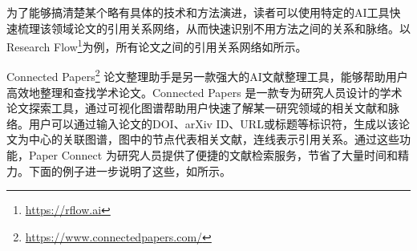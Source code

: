 


为了能够搞清楚某个略有具体的技术和方法演进，读者可以使用特定的AI工具快速梳理该领域论文的引用关系网络，从而快速识别不用方法之间的关系和脉络。以Research Flow\footnote{\url{https://rflow.ai}}为例，所有论文之间的引用关系网络如所示。



Connected Papers\footnote{\url{https://www.connectedpapers.com/}} 论文整理助手是另一款强大的AI文献整理工具，能够帮助用户高效地整理和查找学术论文。Connected Papers 是一款专为研究人员设计的学术论文探索工具，通过可视化图谱帮助用户快速了解某一研究领域的相关文献和脉络。用户可以通过输入论文的DOI、arXiv ID、URL或标题等标识符，生成以该论文为中心的关联图谱，图中的节点代表相关文献，连线表示引用关系。通过这些功能，Paper Connect 为研究人员提供了便捷的文献检索服务，节省了大量时间和精力。下面的例子进一步说明了这些，如所示。

